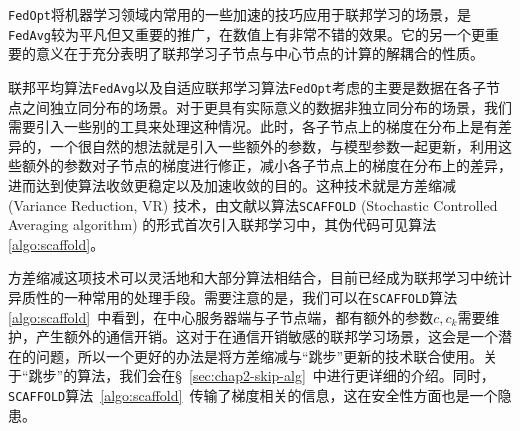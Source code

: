 \texttt{FedOpt}将机器学习领域内常用的一些加速的技巧应用于联邦学习的场景，是\texttt{FedAvg}较为平凡但又重要的推广，在数值上有非常不错的效果。它的另一个更重要的意义在于充分表明了联邦学习子节点与中心节点的计算的解耦合的性质。

联邦平均算法\texttt{FedAvg}以及自适应联邦学习算法\texttt{FedOpt}考虑的主要是数据在各子节点之间独立同分布的场景。对于更具有实际意义的数据非独立同分布的场景，我们需要引入一些别的工具来处理这种情况。此时，各子节点上的梯度在分布上是有差异的，一个很自然的想法就是引入一些额外的参数，与模型参数一起更新，利用这些额外的参数对子节点的梯度进行修正，减小各子节点上的梯度在分布上的差异，进而达到使算法收敛更稳定以及加速收敛的目的。这种技术就是方差缩减 (Variance Reduction, VR) 技术\cite{johnson2013accelerating}，由文献\parencite{karimireddy2020scaffold}以算法\texttt{SCAFFOLD} (Stochastic Controlled Averaging algorithm) 的形式首次引入联邦学习中，其伪代码可见算法\ref{algo:scaffold}。



方差缩减这项技术可以灵活地和大部分算法相结合，目前已经成为联邦学习中统计异质性的一种常用的处理手段。需要注意的是，我们可以在\texttt{SCAFFOLD}算法\ref{algo:scaffold}~中看到，在中心服务器端与子节点端，都有额外的参数$c, c_k$需要维护，产生额外的通信开销。这对于在通信开销敏感的联邦学习场景，这会是一个潜在的问题，所以一个更好的办法是将方差缩减与``跳步''更新的技术联合使用\cite{proxskip-vr}。关于``跳步''的算法，我们会在\S~\ref{sec:chap2-skip-alg}~中进行更详细的介绍。同时，\texttt{SCAFFOLD}算法~\ref{algo:scaffold}~传输了梯度相关的信息，这在安全性方面\cite{zhu2019deep_leakage}也是一个隐患。
